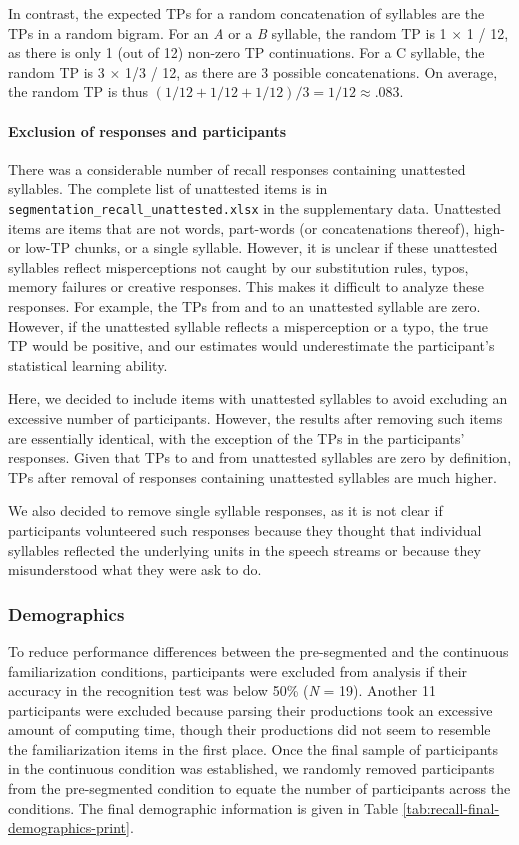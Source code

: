 \documentclass[]{article}
\let\oldparagraph\paragraph
\renewcommand{\paragraph}[1]{\oldparagraph{#1}\mbox{}}
\begin{document}
In contrast, the expected TPs for a random concatenation of syllables are the TPs in a random bigram. For an \emph{A} or a \emph{B} syllable, the random TP is 1 \(\times\) 1 / 12, as there is only 1 (out of 12) non-zero TP continuations. For a C syllable, the random TP is 3 \(\times\) 1/3 / 12, as there are 3 possible concatenations. On average, the random TP is thus \((1/12 + 1/12 + 1/12)/ 3 = 1/12 \approx .083\).

\paragraph{Exclusion of responses and participants}\label{exclusion-of-responses-and-participants}

There was a considerable number of recall responses containing unattested syllables. The complete list of unattested items is in \texttt{segmentation\_recall\_unattested.xlsx} in the supplementary data. Unattested items are items that are not words, part-words (or concatenations thereof), high- or low-TP chunks, or a single syllable. However, it is unclear if these unattested syllables reflect misperceptions not caught by our substitution rules, typos, memory failures or creative responses. This makes it difficult to analyze these responses. For example, the TPs from and to an unattested syllable are zero. However, if the unattested syllable reflects a misperception or a typo, the true TP would be positive, and our estimates would underestimate the participant's statistical learning ability.

Here, we decided to include items with unattested syllables to avoid excluding an excessive number of participants. However, the results after removing such items are essentially identical, with the exception of the TPs in the participants' responses. Given that TPs to and from unattested syllables are zero by definition, TPs after removal of responses containing unattested syllables are much higher.

We also decided to remove single syllable responses, as it is not clear if participants volunteered such responses because they thought that individual syllables reflected the underlying units in the speech streams or because they misunderstood what they were ask to do.

\subsubsection{Demographics}

To reduce performance differences between the pre-segmented and the continuous familiarization conditions, participants were excluded from analysis if their accuracy in the recognition test was below 50\% (\emph{N} = 19). Another 11 participants were excluded because parsing their productions took an excessive amount of computing time, though their productions did not seem to resemble the familiarization items in the first place. Once the final sample of participants in the continuous condition was established, we randomly removed participants from the pre-segmented condition to equate the number of participants across the conditions. The final demographic information is given in Table \ref{tab:recall-final-demographics-print}.
\end{document}
